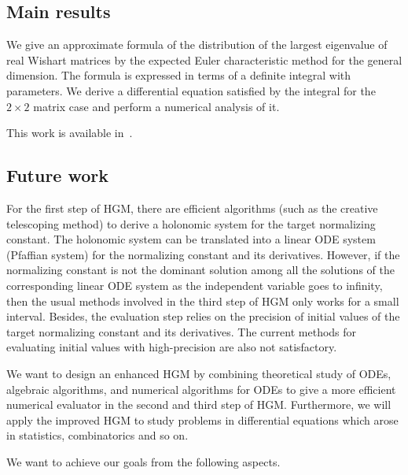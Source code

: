 \documentclass[10pt,a4paper]{article}
\begin{document}
\subsection{Main results}

We give an approximate formula of the distribution of the largest
eigenvalue of real Wishart matrices by the expected Euler characteristic
method for the general dimension.
The formula is expressed in terms of a definite integral with parameters.
We derive a differential equation satisfied by the integral
for the $2 \times 2$ matrix case and perform a numerical analysis of it.

This work is available in~\cite{Takayama2019}.

\subsection{Future work}
For the first step of HGM, there are efficient algorithms (such as the creative telescoping method) to derive a holonomic system for the target normalizing constant. The holonomic system can be translated into a linear ODE system (Pfaffian system) for the normalizing constant and its derivatives. However, if the normalizing constant is not the dominant solution among all the solutions of the corresponding linear ODE system as the independent variable goes to infinity, then the usual methods involved in the third step of HGM only works for a small interval. Besides, the evaluation step relies on the precision of initial values of the target normalizing constant and its derivatives. The current methods for evaluating initial values with high-precision are also not satisfactory. 
 
  We want to design an enhanced HGM by combining theoretical study of ODEs, algebraic algorithms, and numerical algorithms for ODEs to give a more efficient numerical evaluator in the second and third step of HGM. Furthermore, we will apply the improved HGM to study problems in differential equations which arose in statistics, combinatorics and so on.  

We want to achieve our goals from the following aspects.
\end{document}

